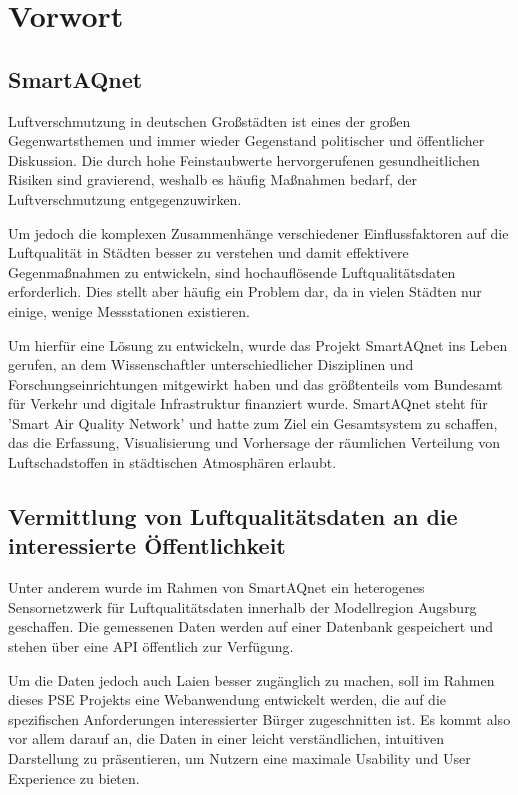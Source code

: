 \section{Vorwort}

\subsection*{\gls{SmartAQnet}}
Luftverschmutzung in deutschen Großstädten ist eines der großen Gegenwartsthemen und immer wieder Gegenstand politischer und öffentlicher Diskussion. 
Die durch hohe Feinstaubwerte hervorgerufenen gesundheitlichen Risiken sind gravierend, weshalb es häufig Maßnahmen bedarf, der Luftverschmutzung 
entgegenzuwirken.

Um jedoch die komplexen Zusammenhänge verschiedener Einflussfaktoren auf die Luftqualität in Städten besser zu verstehen und damit effektivere 
Gegenmaßnahmen zu entwickeln, sind hochauflösende Luftqualitätsdaten erforderlich. Dies stellt aber häufig ein Problem dar, da in vielen Städten 
nur einige, wenige Messstationen existieren.

Um hierfür eine Lösung zu entwickeln, wurde das Projekt \gls{SmartAQnet} ins Leben gerufen, an dem Wissenschaftler unterschiedlicher Disziplinen und 
Forschungseinrichtungen mitgewirkt haben und das größtenteils vom Bundesamt für Verkehr und digitale Infrastruktur finanziert wurde. 
\gls{SmartAQnet} steht für 'Smart Air Quality Network' und hatte zum Ziel ein Gesamtsystem zu schaffen, das die Erfassung, Visualisierung und Vorhersage der räumlichen 
Verteilung von Luftschadstoffen in städtischen Atmosphären erlaubt.

\subsection*{Vermittlung von Luftqualitätsdaten an die interessierte Öffentlichkeit}

Unter anderem wurde im Rahmen von \gls{SmartAQnet} ein heterogenes Sensornetzwerk für Luftqualitätsdaten innerhalb der Modellregion Augsburg geschaffen. 
Die gemessenen Daten werden auf einer Datenbank gespeichert und stehen über eine API öffentlich zur Verfügung.

Um die Daten jedoch auch Laien besser zugänglich zu machen, soll im Rahmen dieses PSE Projekts eine \gls{Webanwendung} entwickelt werden, die auf die 
spezifischen Anforderungen interessierter Bürger zugeschnitten ist. Es kommt also vor allem darauf an, die Daten in einer leicht verständlichen, 
intuitiven Darstellung zu präsentieren, um Nutzern eine maximale Usability und User Experience zu bieten.